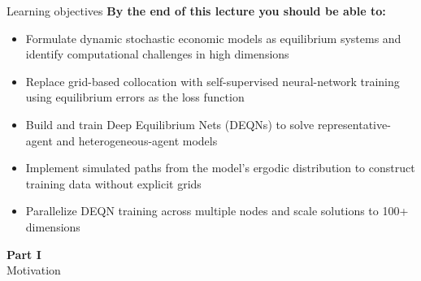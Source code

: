 \documentclass[aspectratio=169,11pt]{beamer}
\begin{document}
\begin{frame}{Learning objectives}
\textbf{By the end of this lecture you should be able to:}
\begin{itemize}
  \item Formulate dynamic stochastic economic models as equilibrium systems and identify computational challenges in high dimensions
  \item Replace grid-based collocation with self-supervised neural-network training using equilibrium errors as the loss function
  \item Build and train Deep Equilibrium Nets (DEQNs) to solve representative-agent and heterogeneous-agent models
  \item Implement simulated paths from the model's ergodic distribution to construct training data without explicit grids
  \item Parallelize DEQN training across multiple nodes and scale solutions to 100+ dimensions
\end{itemize}
\end{frame}



\begin{frame}{}
\vfill
\begin{center}
{\Huge \textcolor{uzhblue}{\textbf{Part I}}}\\[12pt]
{\LARGE Motivation}
\end{center}
\vfill
\end{frame}
\end{document}
